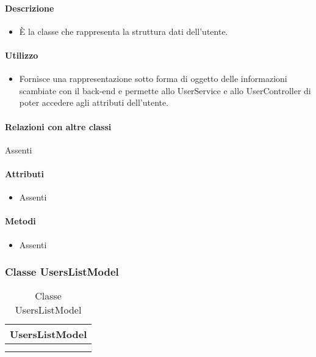 \paragraph*{Descrizione}
\begin{itemize}
\item[] È la classe che rappresenta la struttura dati dell'utente.
\end{itemize}

\paragraph*{Utilizzo}
\begin{itemize}
\item[] Fornisce una rappresentazione sotto forma di oggetto delle informazioni scambiate con il back-end e permette allo UserService e allo UserController di poter accedere agli attributi dell'utente.
\end{itemize}

\paragraph*{Relazioni con altre classi}
Assenti

\paragraph*{Attributi}
\begin{itemize}
\item[] Assenti
\end{itemize}

\paragraph*{Metodi}
\begin{itemize}
\item[] Assenti
\end{itemize}

\subsubsection{Classe UsersListModel}

\begin{table}[ht]
\begin{center}
\bgroup
\setlength{\arrayrulewidth}{0.6mm}
\def\arraystretch{1}
\begin{tabular}{ | p{12cm} | }
\hline
\centerline{\textbf{UsersListModel}}
\\ \hline
 \\ 
\hline
 \\ 
\hline
\end{tabular}
\egroup
\caption{Classe UsersListModel}
\end{center}
\end{table}

